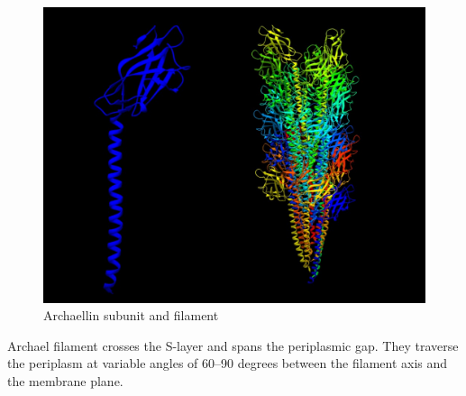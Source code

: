 \documentclass[fontsize=12pt,headsepline=true, bibliography=totocnumbered, twoside]{scrbook} %
\begin{document}
\begin{figure}[h]
\center
\includegraphics[scale=0.5]{subunit}
\caption{Archaellin subunit and filament}
\end{figure}




Archael filament crosses the S-layer and spans the periplasmic gap. They traverse the periplasm at variable angles of 60–90 degrees between the filament axis and the membrane plane. 
\end{document}
